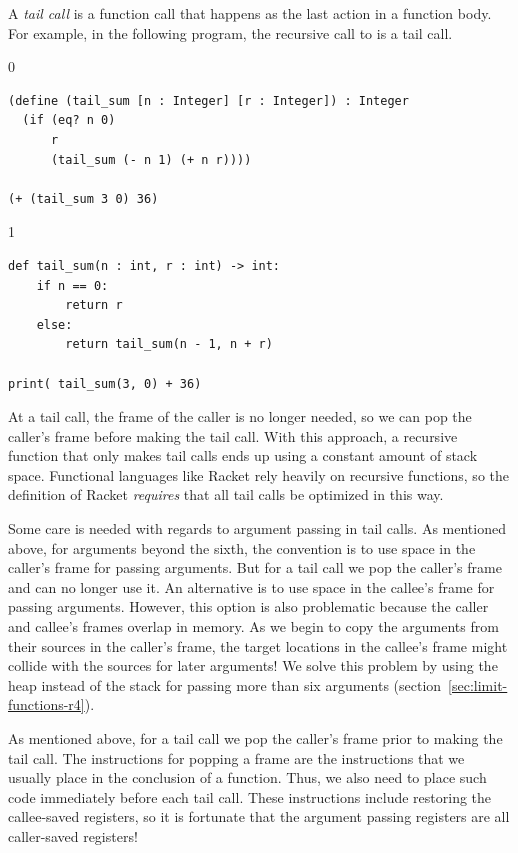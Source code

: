 \documentclass[7x10]{TimesAPriori_MIT}%
\def\racketEd{0}
\def\pythonEd{1}
\def\edition{0}
\numberwithin{theorem}{chapter}
\numberwithin{definition}{chapter}
\numberwithin{equation}{chapter}
\begin{document}
A \emph{tail call} is a function call that
happens as the last action in a function body. 
For example, in the following
program, the recursive call to  is a tail call.
\begin{center}
{\if\edition\racketEd  
\begin{lstlisting}
(define (tail_sum [n : Integer] [r : Integer]) : Integer
  (if (eq? n 0) 
      r
      (tail_sum (- n 1) (+ n r))))

(+ (tail_sum 3 0) 36)
\end{lstlisting}
\fi}
{\if\edition\pythonEd
\begin{lstlisting}
def tail_sum(n : int, r : int) -> int:
    if n == 0:
        return r
    else:
        return tail_sum(n - 1, n + r)

print( tail_sum(3, 0) + 36)
\end{lstlisting}
\fi}
\end{center}
At a tail call, the frame of the caller is no longer needed, so we can
pop the caller's frame before making the tail call. With this
approach, a recursive function that only makes tail calls ends up 
using a constant amount of stack space.  Functional languages like
Racket rely heavily on recursive functions, so the definition of
Racket \emph{requires} that all tail calls be optimized in this way.

Some care is needed with regards to argument passing in tail calls.
As mentioned above, for arguments beyond the sixth, the convention is
to use space in the caller's frame for passing arguments.  But for a
tail call we pop the caller's frame and can no longer use it.  An
alternative is to use space in the callee's frame for passing
arguments. However, this option is also problematic because the caller
and callee's frames overlap in memory.  As we begin to copy the
arguments from their sources in the caller's frame, the target
locations in the callee's frame might collide with the sources for
later arguments! We solve this problem by using the heap instead of
the stack for passing more than six arguments
(section~\ref{sec:limit-functions-r4}).

As mentioned above, for a tail call we pop the caller's frame prior to
making the tail call. The instructions for popping a frame are the
instructions that we usually place in the conclusion of a
function. Thus, we also need to place such code immediately before
each tail call. These instructions include restoring the callee-saved
registers, so it is fortunate that the argument passing registers are
all caller-saved registers!
\end{document}
